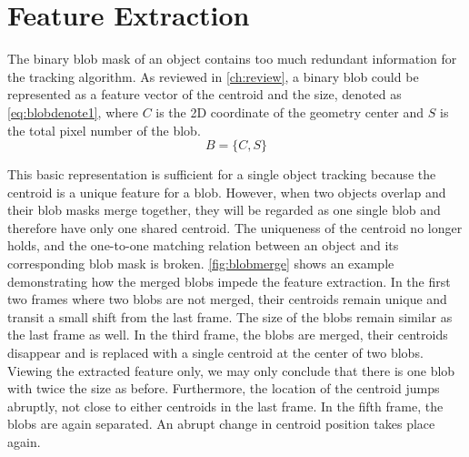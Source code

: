 \section{Feature Extraction} \label{sec:featureextract}
The binary blob mask of an object contains too much redundant information for the tracking algorithm. As reviewed in \autoref{ch:review}, a binary blob could be represented as a feature vector of the centroid and the size, denoted as \autoref{eq:blobdenote1}, where $C$ is the 2D coordinate of the geometry center and $S$ is the total pixel number of the blob.
\begin{equation}\label{eq:blobdenote1}
  B = \{C,S\}
\end{equation}

This basic representation is sufficient for a single object tracking because the centroid is a unique feature for a blob. However, when two objects overlap and their blob masks merge together, they will be regarded as one single blob and therefore have only one shared centroid. The uniqueness of the centroid no longer holds, and the one-to-one matching relation between an object and its corresponding blob mask is broken.
\autoref{fig:blobmerge} shows an example demonstrating how the merged blobs impede the feature extraction. In the first two frames where two blobs are not merged, their centroids remain unique and transit a small shift from the last frame. The size of the blobs remain similar as the last frame as well. In the third frame, the blobs are merged, their centroids disappear and is replaced with a single centroid at the center of two blobs. Viewing the extracted feature only, we may only conclude that there is one blob with twice the size as before. Furthermore, the location of the centroid jumps abruptly, not close to either centroids in the last frame. In the fifth frame, the blobs are again separated. An abrupt change in centroid position takes place again.

